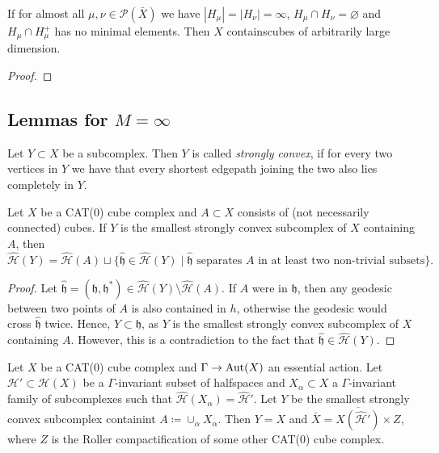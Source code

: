 
\begin{prop}[{\cite[Proposition~4.10]{MR3509968}}]
  \label{prop:4.10}
  If for almost all \(\mu, \nu \in \mathcal{P}(\bar X)\) we have \(|H_\mu| = |H_\nu| = \infty\), \(H_\mu \cap H_\nu = \varnothing\) and \(H_\mu \cap H_\mu^+\) has no minimal elements. Then \(X\) containscubes of arbitrarily large dimension.
\end{prop}

\begin{proof}
\end{proof}

\subsection{Lemmas for \(M = \infty\)}
\label{sec:M=infty}

\begin{defin}
  Let \(Y \subset X\) be a subcomplex. Then \(Y\) is called \emph{strongly convex}, if for every two vertices in \(Y\) we have that every shortest edgepath joining the two also lies completely in \(Y\).
\end{defin}

\begin{lemma}[{\cite[Lemma~4.16]{MR3509968}}]
  \label{lem:4.16}
  Let \(X\) be a CAT(0) cube complex and \(A \subset X\) consists of (not necessarily connected) cubes. If \(Y\) is the smallest strongly convex subcomplex of \(X\) containing \(A\), then
  \[
    \mathcal{\hat H}(Y) = \mathcal{\hat H}(A) \sqcup \{\mathfrak{\hat h} \in \mathcal{\hat H}(Y) \mid \mathfrak{\hat h} \text{ separates } A \text{ in at least two non-trivial subsets}\}.
  \]
\end{lemma}

\begin{proof}
  Let \(\mathfrak{\hat h} = (\mathfrak{h}, \mathfrak{h}^\ast) \in \mathcal{\hat H}(Y) \setminus \mathcal{\hat H}(A)\). If \(A\) were in \(\mathfrak{h}\), then any geodesic between two points of \(A\) is also contained in \(h\), otherwise the geodesic would cross \(\mathfrak{\hat h}\) twice. Hence, \(Y \subset \mathfrak{h}\), as \(Y\) is the smallest strongly convex subcomplex of \(X\) containing \(A\). However, this is a contradiction to the fact that \(\mathfrak{\hat h} \in \mathcal{\hat H}(Y)\).
\end{proof}

\begin{prop}[{\cite[Proposition~4.17]{MR3509968}}]
  \label{prop:4.17}
  Let \(X\) be a CAT(0) cube complex and \(\Gamma \to \operatorname{Aut}(X)\) an essential action. Let \(\mathcal{H}' \subset \mathcal{H}(X)\) be a \(\Gamma\)-invariant subset of halfspaces and \(X_\alpha \subset X\) a \(\Gamma\)-invariant family of subcomplexes such that \(\mathcal{\hat H}(X_\alpha) = \mathcal{\hat H}'\). Let \(Y\) be the smallest strongly convex subcomplex containint \(A \coloneqq \cup_\alpha X_\alpha\). Then \(Y = X\) and \(\bar X = \overline{X(\mathcal{\hat H}')} \times Z\), where \(Z\) is the Roller compactification of some other CAT(0) cube complex.
\end{prop}

